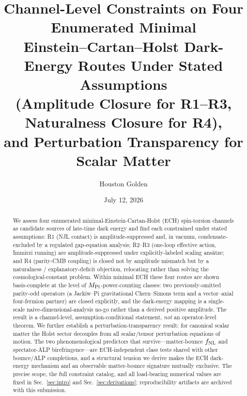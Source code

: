 \documentclass[aps,prd,twocolumn,superscriptaddress,showpacs,preprintnumbers,nofootinbib,longbibliography,floatfix]{revtex4-2}
\newcommand{\fnl}{f_{\rm NL}}
\newcommand{\paperTimestamp}{July 12, 2026}
\begin{document}

\title{Channel-Level Constraints on Four Enumerated Minimal\\
Einstein--Cartan--Holst Dark-Energy Routes Under Stated Assumptions\\
(Amplitude Closure for R1--R3, Naturalness Closure for R4),\\
and Perturbation Transparency for Scalar Matter}

\author{Houston Golden}

\date{\paperTimestamp}

\begin{abstract}
We assess four enumerated minimal-Einstein-Cartan-Holst (ECH) spin-torsion
channels as candidate sources of late-time dark energy and find each
constrained under stated assumptions: R1 (NJL contact) is amplitude-suppressed
and, in vacuum, condensate-excluded by a regulated gap-equation analysis;
R2--R3 (one-loop effective action, Immirzi running) are amplitude-suppressed
under explicitly-labeled scaling ans\"atze; and R4 (parity-CMB coupling) is
closed not by amplitude mismatch but by a naturalness / explanatory-deficit
objection, relocating rather than solving the cosmological-constant problem.
Within minimal ECH these four routes are shown basis-complete at the level of
$M_{\rm Pl}$-power-counting classes: two previously-omitted parity-odd operators
(a Jackiw--Pi gravitational Chern--Simons term and a vector--axial four-fermion
partner) are closed explicitly, and the dark-energy mapping is a single-scale
naive-dimensional-analysis no-go rather than a derived positive amplitude. The
result is a channel-level, assumption-conditional statement, \emph{not} an
operator-level theorem. We further establish a perturbation-transparency
result: for canonical scalar matter the Holst sector decouples from all
scalar/tensor perturbation equations of motion. The two phenomenological
predictors that survive---matter-bounce $\fnl$ and spectator-ALP
birefringence---are ECH-independent class tests shared with other bounce/ALP
completions, and a structural tension we derive makes the ECH dark-energy
mechanism and an observable matter-bounce signature mutually exclusive. The
precise scope, the full constraint catalog, and all load-bearing numerical
values are fixed in Sec.~\ref{sec:intro} and Sec.~\ref{sec:derivations};
reproducibility artifacts are archived with this submission.
\end{abstract}
\end{document}
